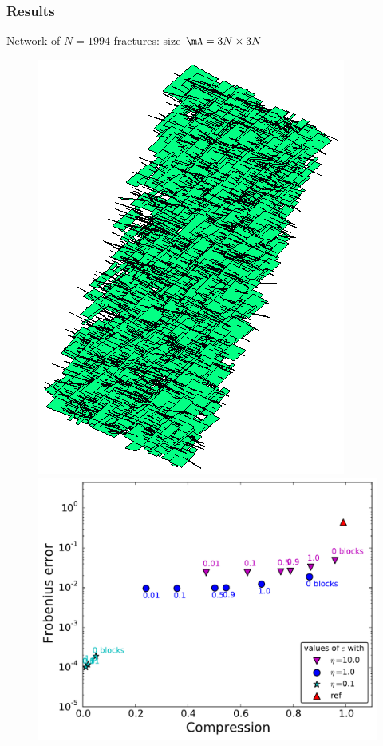 \begin{frame}
\frametitle{Results}

\small

Network of $N=1994$ \alert{fractures}: size $\mA=3N\times 3N$
\vspace{-5pt}
\begin{figure}
\centering
\begin{minipage}[c]{.39\linewidth}
\includegraphics[width=.9\textwidth]{../images/visu_maillage1994Fracs.png}
\end{minipage}
\begin{minipage}[c]{.6\linewidth}
\includegraphics[width=\textwidth]{../images/graphe_compasparse_output_compression_18_08_2016matrice1994Fracs.pdf}
\end{minipage}
\end{figure}


\end{frame}
